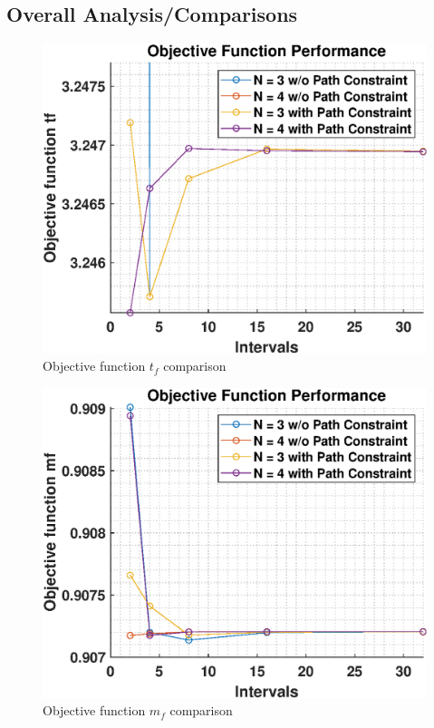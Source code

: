 \documentclass[]{article}
\begin{document}
	\subsection{Overall Analysis/Comparisons}
    \begin{figure}
		\centering
		\includegraphics[scale=0.75]{minTfComparison.eps}
		\caption{Objective function \(t_f\) comparison}
		\label{fig:minTfComparison}
	\end{figure}
	\begin{figure}
		\centering
		\includegraphics[scale=0.75]{maxMfComparison.eps}
		\caption{Objective function \(m_f\) comparison}
		\label{fig:maxMfComparison}
	\end{figure}
\end{document}
